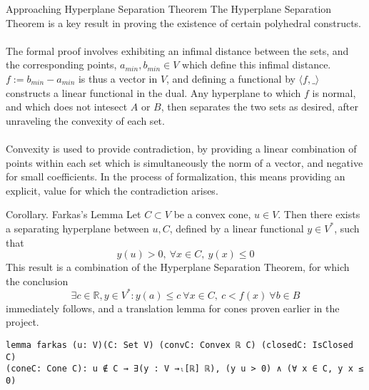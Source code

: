 \documentclass[final]{beamer}
\newlength{\colwidth}
\begin{document}
\begin{frame}[fragile]
\begin{columns}[t]
\begin{column}{\colwidth}
            \begin{block}{Approaching Hyperplane Separation Theorem}
                The Hyperplane Separation Theorem is a key result in proving the existence of certain polyhedral constructs.
                \\\\The formal proof involves exhibiting an infimal distance between the sets, and the corresponding points, $a_{min}, b_{min} \in V$ which define this infimal distance.
                $f:= b_{min}-a_{min}$ is thus a vector in $V$, and defining a functional by $\langle f, \_\rangle$ constructs a linear functional in the dual. Any hyperplane to which $f$
                is normal, and which does not intesect $A$ or $B$, then separates the two sets as desired, after unraveling the convexity of each set.
                \\\\Convexity is used to provide contradiction, by providing a linear combination of points within each set which is simultaneously the norm of a vector,
                and negative for small coefficients. In the process of formalization, this means providing an explicit, value for which the contradiction arises.         
            \end{block}
            
             
            \begin{exampleblock}{Corollary. Farkas's Lemma}
              Let $C \subset V$ be a convex cone, $u\in V$. Then there exists a separating hyperplane between $u, C$, defined by a linear functional $y \in V^*$, such that \begin{equation}
              y(u)> 0, \ \forall x\in C, \ y(x) \le 0
              \end{equation} This result is  a combination of the Hyperplane Separation Theorem, for which the conclusion \begin{equation}
                \exists c\in \mathbb{R}, y \in V^*: y(a) \le c\ \forall x\in C, \ c < f(x)\ \forall b\in B
              \end{equation} immediately follows, and a translation lemma for cones proven earlier in the project.
\begin{verbatim}
lemma farkas (u: V)(C: Set V) (convC: Convex ℝ C) (closedC: IsClosed C)
(coneC: Cone C): u ∉ C → ∃(y : V →ₗ[ℝ] ℝ), (y u > 0) ∧ (∀ x ∈ C, y x ≤ 0)
\end{verbatim}  
           

\end{exampleblock}
\end{column}
\end{columns}
\end{frame}
\end{document}
